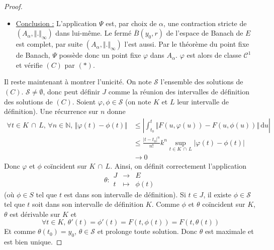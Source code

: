 \begin{proof}
\begin{itemize}
			\item \uline{Conclusion :} L'application $\Psi$ est, par choix de $\alpha$, une contraction stricte de $(A_\alpha, \Vert . \Vert_{\infty})$ dans lui-même. Le fermé $\overline{B}(y_0, r)$ de l'espace de Banach de $E$ est complet, par suite $(A_\alpha, \Vert . \Vert_{\infty})$ l'est aussi.
			\newpar
			Par le théorème du point fixe de Banach, $\Psi$ possède donc un point fixe $\varphi$ dans $A_\alpha$. $\varphi$ est alors de classe $\mathcal{C}^1$ et vérifie $(C)$ par $(*)$.
		\end{itemize}
		\medskip
		Il reste maintenant à montrer l'unicité. On note $\mathcal{S}$ l'ensemble des solutions de $(C)$. $\mathcal{S} \neq \emptyset$, donc peut définir $J$ comme la réunion des intervalles de définition des solutions de $(C)$.
		\newpar
		Soient $\varphi, \phi \in \mathcal{S}$ (on note $K$ et $L$ leur intervalle de définition). Une récurrence sur $n$ donne
		\begin{align*}
			\forall t \in K \, \cap \, L, \, \forall n \in \mathbb{N}, \, \Vert \varphi(t) - \phi(t) \Vert &\leq \left| \int_{t_0}^t \Vert F(u, \varphi(u)) - F(u, \phi(u)) \Vert \, \mathrm{d}u \right| \\
			&\leq \frac{|t-t_0|^n}{n!} k^n \sup_{t \in K \, \cap \, L} |\varphi(t) - \phi(t)| \\
			&\longrightarrow 0
		\end{align*}
		Donc $\varphi$ et $\phi$ coïncident sur $K \, \cap \, L$.
		\newpar
		Ainsi, on définit correctement l'application
		\[
		\theta :
		\begin{array}{ccc}
			J &\rightarrow& E \\
			t &\mapsto& \phi(t)
		\end{array}
		\]
		(où $\phi \in S$ tel que $t$ est dans son intervalle de définition). Si $t \in J$, il existe $\phi \in \mathcal{S}$ tel que $t$ soit dans son intervalle de définition $K$. Comme $\phi$ et $\theta$ coïncident sur $K$, $\theta$ est dérivable sur $K$ et
		\[ \forall t \in K, \, \theta'(t) = \phi'(t) = F(t, \phi(t)) = F(t, \theta(t)) \]
		Et comme $\theta(t_0) = y_0$, $\theta \in \mathcal{S}$ et prolonge toute solution. Donc $\theta$ est maximale et est bien unique.
	\end{proof}

